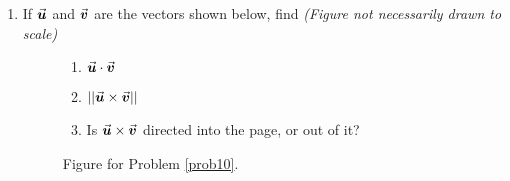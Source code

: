 \begin{enumerate}
\addtocounter{enumi}{7}

\item If \(\u\) and \(\v\) are the vectors shown below, find%
\textit{(Figure not necessarily drawn to scale)} \label{prob10}%

\begin{figure}[!h]
\begin{enumerate}
\item  \(\u\cdot\v\) \label{prob10a}%
\item  \(||\u\times\v||\) \label{prob10b}%
\item Is \(\u \times \v\) directed into the page, or out of it? \label{prob10c}%
\end{enumerate}
\caption{Figure for Problem \ref{prob10}.}
\end{figure}


\end{enumerate}
